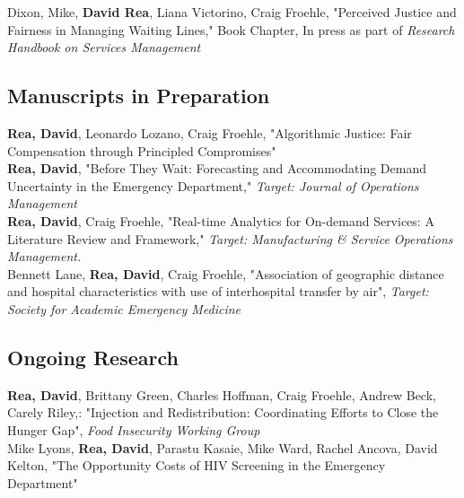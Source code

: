 \documentclass[12pt, letter]{moderncv}
\begin{document}
\medskip
Dixon, Mike, \textbf{David Rea}, Liana Victorino, Craig Froehle, "Perceived Justice and Fairness in Managing Waiting Lines," Book Chapter, \newline In press as part of \textit{Research Handbook on Services Management}


\subsection{Manuscripts in Preparation}
\smallskip
\textbf{Rea, David}, Leonardo Lozano, Craig Froehle,  "Algorithmic Justice: Fair Compensation through Principled Compromises" \textit{}
\medskip\\
\textbf{Rea, David}, "Before They Wait: Forecasting and Accommodating Demand Uncertainty in the Emergency Department," \textit{Target: Journal of Operations Management}
\medskip\\
%
\textbf{Rea, David}, Craig Froehle, "Real-time Analytics for On-demand Services: A Literature Review and Framework," \textit{Target: Manufacturing \& Service Operations Management.}
\medskip \\
Bennett Lane, \textbf{Rea, David}, Craig Froehle, "Association of geographic distance and hospital characteristics with use of interhospital transfer by air", \textit{Target: Society for Academic Emergency Medicine} 

\subsection{Ongoing Research}

\textbf{Rea, David}, Brittany Green, Charles Hoffman, Craig Froehle, Andrew Beck, Carely Riley,: "Injection and Redistribution: Coordinating Efforts to Close the Hunger Gap", \textit{Food Insecurity Working Group}
\medskip \\
 Mike Lyons, \textbf{Rea, David}, Parastu Kasaie, Mike Ward, Rachel Ancova, David Kelton, "The Opportunity Costs of HIV Screening in the Emergency Department" 
\end{document}
